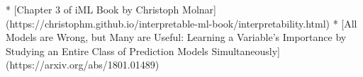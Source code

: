 * [Chapter 3 of iML Book by Christoph Molnar](https://christophm.github.io/interpretable-ml-book/interpretability.html)
* [All Models are Wrong, but Many are Useful: Learning a Variable's Importance by Studying an Entire Class of Prediction Models Simultaneously](https://arxiv.org/abs/1801.01489)
